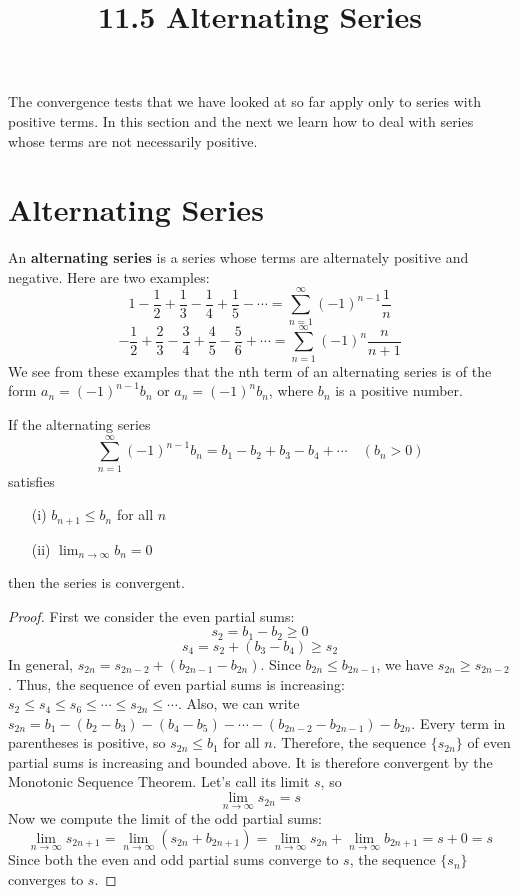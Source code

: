 \documentclass{article}
\title{11.5 Alternating Series}
\date{}
\author{}
\theoremstyle{mystyle}
\begin{document}
\maketitle

The convergence tests that we have looked at so far apply only to series with positive terms. In this section and the next we learn how to deal with series whose terms are not necessarily positive.

\section*{Alternating Series}
An \textbf{alternating series} is a series whose terms are alternately positive and negative. Here are two examples:
\[ 1 - \frac{1}{2} + \frac{1}{3} - \frac{1}{4} + \frac{1}{5} - \cdots = \sum_{n=1}^{\infty} (-1)^{n-1} \frac{1}{n} \]
\[ -\frac{1}{2} + \frac{2}{3} - \frac{3}{4} + \frac{4}{5} - \frac{5}{6} + \cdots = \sum_{n=1}^{\infty} (-1)^{n} \frac{n}{n+1} \]
We see from these examples that the nth term of an alternating series is of the form \( a_n = (-1)^{n-1}b_n \) or \( a_n = (-1)^n b_n \), where \(b_n\) is a positive number.

\begin{tcolorbox}[
    colback=white,
    colframe=orange!80!white,
    title=The Alternating Series Test,
    boxrule=0.5mm,
    arc=3mm
    ]
    If the alternating series
    \[ \sum_{n=1}^{\infty} (-1)^{n-1}b_n = b_1 - b_2 + b_3 - b_4 + \cdots \quad (b_n > 0) \]
    satisfies
    \begin{itemize}
        \item[(i)] \( b_{n+1} \le b_n \) for all \(n\)
        \item[(ii)] \( \lim_{n\to\infty} b_n = 0 \)
    \end{itemize}
    then the series is convergent.
\end{tcolorbox}


\begin{proof}
[Proof]
First we consider the even partial sums:
\[ s_2 = b_1 - b_2 \ge 0 \]
\[ s_4 = s_2 + (b_3 - b_4) \ge s_2 \]
In general, \( s_{2n} = s_{2n-2} + (b_{2n-1} - b_{2n}) \). Since \(b_{2n} \le b_{2n-1}\), we have \(s_{2n} \ge s_{2n-2}\).
Thus, the sequence of even partial sums is increasing: \( s_2 \le s_4 \le s_6 \le \cdots \le s_{2n} \le \cdots \).
Also, we can write \( s_{2n} = b_1 - (b_2 - b_3) - (b_4 - b_5) - \cdots - (b_{2n-2} - b_{2n-1}) - b_{2n} \).
Every term in parentheses is positive, so \( s_{2n} \le b_1 \) for all \(n\).
Therefore, the sequence \(\{s_{2n}\}\) of even partial sums is increasing and bounded above. It is therefore convergent by the Monotonic Sequence Theorem. Let's call its limit \(s\), so
\[ \lim_{n\to\infty} s_{2n} = s \]
Now we compute the limit of the odd partial sums:
\[ \lim_{n\to\infty} s_{2n+1} = \lim_{n\to\infty} (s_{2n} + b_{2n+1}) = \lim_{n\to\infty} s_{2n} + \lim_{n\to\infty} b_{2n+1} = s + 0 = s \]
Since both the even and odd partial sums converge to \(s\), the sequence \(\{s_n\}\) converges to \(s\).
\end{proof}
\end{document}
